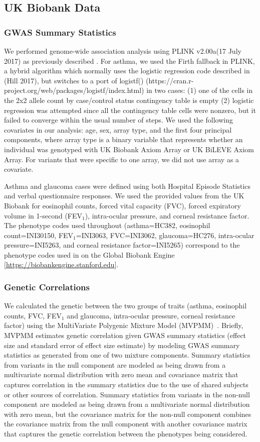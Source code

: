 \subsection*{UK Biobank Data}
\subsubsection*{GWAS Summary Statistics}
We performed genome-wide association analysis using PLINK v2.00a(17 July 2017) as previously described \cite{DeBoever179762}. For asthma, we used the Firth fallback in PLINK, a hybrid algorithm which normally uses the logistic regression code described in (Hill 2017), but switches to a port of logistf() (https://cran.r-project.org/web/packages/logistf/index.html) in two cases: (1) one of the cells in the 2x2 allele count by case/control status contingency table is empty (2) logistic regression was attempted since all the contingency table cells were nonzero, but it failed to converge within the usual number of steps. We used the following covariates in our analysis: age, sex, array type, and the first four principal components, where array type is a binary variable that represents whether an individual was genotyped with UK Biobank Axiom Array or UK BiLEVE Axiom Array. For variants that were specific to one array, we did not use array as a covariate. 

Asthma and glaucoma cases were defined using both Hospital Episode Statistics and verbal questionnaire responses. We used the provided values from the UK Biobank for eosinophil counts, forced vital capacity (FVC), forced expiratory volume in 1-second (FEV$_1$), intra-ocular pressure, and corneal resistance factor. The phenotype codes used throughout (asthma=HC382, eosinophil count=INI30150, FEV$_1$=INI3063, FVC=INI3062, glaucoma=HC276, intra-ocular pressure=INI5263, and corneal resistance factor=INI5265) correspond to the phenotype codes used in on the Global Biobank Engine [\url{https://biobankengine.stanford.edu}].

\subsubsection*{Genetic Correlations}
We calculated the genetic between the two groups of traits (asthma, eosinophil counts, FVC, FEV$_1$ and glaucoma, intra-ocular pressure, corneal resistance factor) using the MultiVariate Polygenic Mixture Model (MVPMM)~\cite{DeBoever2017}. Briefly, MVPMM estimates genetic correlation given GWAS summary statistics (effect size and standard error of effect size estimate) by modeling GWAS summary statistics as generated from one of two mixture components. Summary statistics from variants in the null component are modeled as being drawn from a multivariate normal distribution with zero mean and covariance matrix that captures correlation in the summary statistics due to the use of shared subjects or other sources of correlation. Summary statistics from variants in the non-null component are modeled as being drawn from a multivariate normal distribution with zero mean, but the covariance matrix for the non-null component combines the covariance matrix from the null component with another covariance matrix that captures the genetic correlation between the phenotypes being considered.

